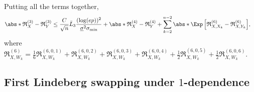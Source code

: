\documentclass[aos]{imsart}
\begin{document}
\begin{appendix}
\begin{equation*}
\end{equation*} 
Putting all the terms together,
\begin{equation*}
\begin{aligned}
    & \abs*{ \mathfrak{R}_X^{(3)} - \mathfrak{R}_Y^{(3)} } 
    \leq \frac{C}{\sqrt{n}} \bar{L}_{3} \frac{(\log(ep))^2}{\underline\sigma^2 \sigma_{\min}}
    + \abs*{ \mathfrak{R}_X^{(4)} - \mathfrak{R}_Y^{(4)} }
    + \sum_{k=2}^{n-2} \abs*{\Exp \left[ 
        \mathfrak{R}_{X,X_k}^{(6)}
        - \mathfrak{R}_{X,Y_k}^{(6)}
    \right] },
\end{aligned}
\end{equation*}
where $\mathfrak{R}_{X,W_k}^{(6)} = \frac{1}{6} \mathfrak{R}_{X,W_k}^{(6,0,1)} + \mathfrak{R}_{X,W_k}^{(6,0,2)} + \mathfrak{R}_{X,W_k}^{(6,0,3)} + \mathfrak{R}_{X,W_k}^{(6,0,4)} + \frac{1}{2} \mathfrak{R}_{X,W_k}^{(6,0,5)} + \frac{1}{2} \mathfrak{R}_{X,W_k}^{(6,0,6)}$.







\subsection{First Lindeberg swapping under \texorpdfstring{$1$}{1}-dependence} \label{sec:first_lindeberg_swapping}


\end{appendix}
\end{document}
